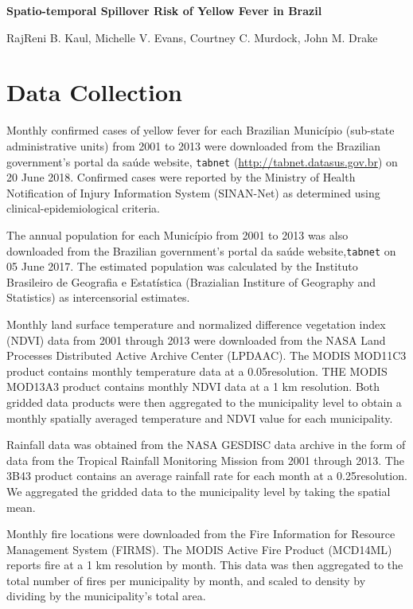 \documentclass{article}
\begin{document}
\noindent
\textbf{\LARGE{Spatio-temporal Spillover Risk of Yellow Fever in Brazil}}

\bigskip
\noindent
RajReni B. Kaul, Michelle V. Evans, Courtney C. Murdock, John M. Drake
\smallskip

\tableofcontents

\newpage

\section{Data Collection}

Monthly confirmed cases of yellow fever for each Brazilian Munic\'{i}pio (sub-state administrative units) from 2001 to 2013 were downloaded from the Brazilian government's portal da sa\'{u}de website, \texttt{tabnet} (\url{http://tabnet.datasus.gov.br}) on 20 June 2018.
Confirmed cases were reported by the Ministry of Health Notification of Injury Information System (SINAN-Net) as determined using clinical-epidemiological criteria.

The annual population for each Munic\'{i}pio from 2001 to 2013 was also downloaded from the Brazilian government's portal da sa\'{u}de website,\texttt{tabnet} on 05 June 2017. The estimated population was calculated by the Instituto Brasileiro de Geografia e Estat\'{i}stica (Brazialian Institure of Geography and Statistics) as intercensorial estimates.

Monthly land surface temperature and normalized difference vegetation index (NDVI) data from 2001 through 2013 were downloaded from the NASA Land Processes Distributed Active Archive Center (LPDAAC). The MODIS MOD11C3 product contains monthly temperature data at a 0.05\degree resolution. THE MODIS MOD13A3 product contains monthly NDVI data at a 1 km resolution. Both gridded data products were then aggregated to the municipality level to obtain a monthly spatially averaged temperature and NDVI value for each municipality.

Rainfall data was obtained from the NASA GESDISC data archive in the form of data from the Tropical Rainfall Monitoring Mission from 2001 through 2013. The 3B43 product contains an average rainfall rate for each month at a 0.25\degree resolution. We aggregated the gridded data to the municipality level by taking the spatial mean.

Monthly fire locations were downloaded from the Fire Information for Resource Management System (FIRMS). The MODIS Active Fire Product (MCD14ML) reports fire at a 1 km resolution by month. This data was then aggregated to the total number of fires per municipality by month, and scaled to density by dividing by the municipality's total area.
\end{document}
